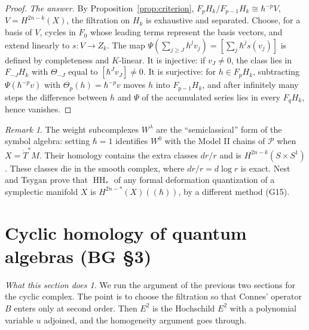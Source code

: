 \documentclass[11pt,oneside,reqno]{article}
\DeclareMathOperator{\HH}{HH}
\newcommand{\cP}{\mathcal P}
\newcommand{\Tdot}{\dot T^*}
\newcommand{\hb}{\hbar}
\newcommand{\Lser}[1]{(\!(#1)\!)}
\theoremstyle{plain}
\theoremstyle{definition}
\theoremstyle{remark}
\newtheorem{remark}[theorem]{Remark}
\newtheorem*{whatdoes}{What this section does}
\begin{document}
\begin{proof}
\emph{The answer.} By Proposition~\ref{prop:criterion},
\(F_pH_k/F_{p-1}H_k\cong\hb^{-p}V\), \(V=H^{2n-k}(X)\), the filtration on \(H_k\) is
exhaustive and separated. Choose, for a basis of \(V\), cycles in \(F_0\) whose
leading terms represent the basis vectors, and extend linearly to
\(s:V\to Z_k\). The map \(\Psi(\sum_{j\ge J}\hb^jv_j)=[\sum_j\hb^js(v_j)]\) is defined by
completeness and \(K\)-linear. It is injective: if \(v_J\ne0\), the class lies in
\(F_{-J}H_k\) with \(\Theta_{-J}\) equal to \([\hb^Jv_J]\neq0\). It is surjective: for
\(h\in F_pH_k\), subtracting \(\Psi(\hb^{-p}v)\) with \(\Theta_p(h)=\hb^{-p}v\) moves \(h\) into
\(F_{p-1}H_k\), and after infinitely many steps the difference between \(h\) and
\(\Psi\) of the accumulated series lies in every \(F_qH_k\), hence vanishes.
\end{proof}

\begin{remark}
The weight subcomplexes \(W^\lambda\) are the ``semiclassical'' form of the symbol
algebra: setting \(\hb=1\) identifies \(W^0\) with the Model II chains of \(\cP\)
when \(X=\Tdot M\). Their homology contains the extra classes \(dr/r\) and is
\(H^{2n-k}(S\times S^1)\). These classes die in the smooth complex, where
\(dr/r=d\log r\) is exact. Nest and Tsygan \cite{NestTsygan} prove that
\(\HH_*\) of any formal deformation quantization of a symplectic manifold
\(X\) is \(H^{2n-*}(X)\Lser{\hb}\), by a different method (G15).
\end{remark}

\section{Cyclic homology of quantum algebras (BG \S3)}\label{sec:BG3}

\begin{whatdoes}
We run the argument of the previous two sections for the cyclic complex.
The point is to choose the filtration so that Connes' operator \(B\) enters only
at second order. Then \(E^2\) is the Hochschild \(E^2\) with a polynomial variable
\(u\) adjoined, and the homogeneity argument goes through.
\end{whatdoes}
\end{document}
